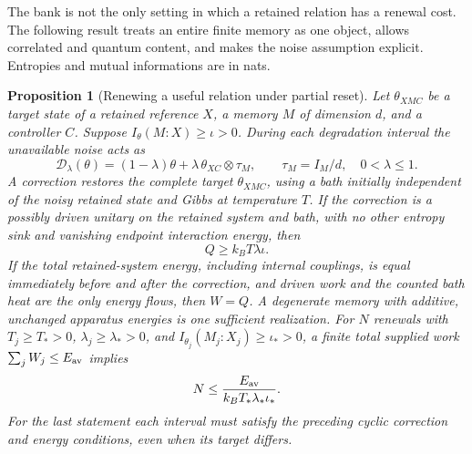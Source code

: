 \documentclass[12pt,a4paper]{article}
\newtheorem{proposition}{Proposition}
\begin{document}
The bank is not the only setting in which a retained relation has a renewal cost. The following result treats an entire finite memory as one object, allows correlated and quantum content, and makes the noise assumption explicit. Entropies and mutual informations are in nats.

\begin{proposition}[Renewing a useful relation under partial reset]
\label{prop:body}
Let $\theta_{XMC}$ be a target state of a retained reference $X$, a memory $M$ of dimension $d$, and a controller $C$. Suppose $I_\theta(M:X)\ge\iota>0$. During each degradation interval the unavailable noise acts as
\[
 \mathcal D_\lambda(\theta)
 =(1-\lambda)\theta+
 \lambda\,\theta_{XC}\otimes\tau_M,\qquad
 \tau_M=I_M/d,\quad 0<\lambda\le1.
\]
A correction restores the complete target $\theta_{XMC}$, using a bath initially independent of the noisy retained state and Gibbs at temperature $T$. If the correction is a possibly driven unitary on the retained system and bath, with no other entropy sink and vanishing endpoint interaction energy, then
\begin{equation}\label{eq:heatbody}
 Q\ge k_BT\lambda\iota.
\end{equation}
If the total retained-system energy, including internal couplings, is equal immediately before and after the correction, and driven work and the counted bath heat are the only energy flows, then $W=Q$. A degenerate memory with additive, unchanged apparatus energies is one sufficient realization. For $N$ renewals with $T_j\ge T_*>0$, $\lambda_j\ge\lambda_*>0$, and $I_{\theta_j}(M_j:X_j)\ge\iota_*>0$, a finite total supplied work $\sum_j W_j\le E_{\rm av}$ implies
\begin{equation}\label{eq:number}
 N\le\frac{E_{\rm av}}{k_BT_*\lambda_*\iota_*}.
\end{equation}
For the last statement each interval must satisfy the preceding cyclic correction and energy conditions, even when its target differs.
\end{proposition}
\end{document}
